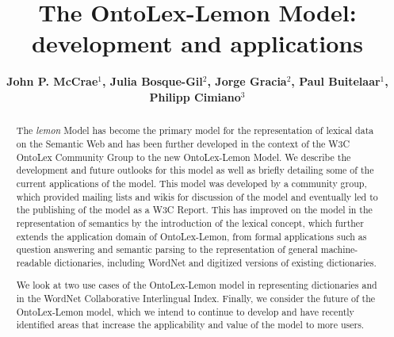 \documentclass[12pt,a4paper]{elex2017}
\begin{document}
\mainmatter
\title{The OntoLex-Lemon Model: development and applications}
\author{\bf John P. McCrae$^1$, Julia Bosque-Gil$^2$, Jorge Gracia$^2$, Paul
Buitelaar$^1$, Philipp Cimiano$^{3}$}

\maketitle

\begin{abstract}
    The \emph{lemon} Model has become the primary
model for the representation of lexical data on the Semantic Web and has been
further developed in the context of the W3C OntoLex Community Group to the new
    OntoLex-Lemon Model.
We describe the development and future outlooks for this model as well
as briefly detailing some of the current applications of the model. 
This model was developed by a community group, which provided mailing lists and wikis
for discussion of the model and eventually led to the publishing of the model as
a W3C Report. This has improved on the model in the representation of
    semantics by the introduction of the lexical concept, which
further
extends the application domain of OntoLex-Lemon, from formal applications such
as question answering and semantic parsing to the representation of general
machine-readable dictionaries, including WordNet and digitized versions of
existing dictionaries.

We look at two use cases of the OntoLex-Lemon model in representing dictionaries
and in the WordNet Collaborative Interlingual Index.
Finally, we consider the future of the OntoLex-Lemon model, which we intend to
continue to develop and have recently identified areas that
increase the applicability and value of the model to more users.

\end{abstract}
\end{document}
